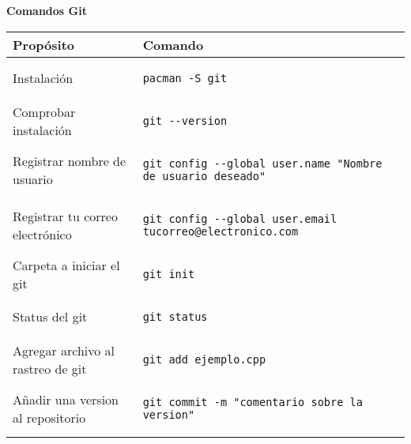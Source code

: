 \documentclass[landscape]{article}
\author{Nombre}
\begin{document}
	


\lstset{language=bash}  
\textbf{Comandos Git} \\

\begin{table}[ht]
\begin{center}
\begin{tabular}{| l | l |}

\hline
Propósito & Comando\\ \hline

Instalación & 
\begin{lstlisting}
pacman -S git
\end{lstlisting}\\ \hline

Comprobar instalación & 
\begin{lstlisting}
git --version
\end{lstlisting}\\ \hline


Registrar nombre de usuario  & 
\begin{lstlisting}
git config --global user.name "Nombre de usuario deseado" 
\end{lstlisting}\\ \hline

Registrar tu correo electrónico &
\begin{lstlisting}
git config --global user.email tucorreo@electronico.com
\end{lstlisting}\\ \hline

Carpeta a iniciar el git &
\begin{lstlisting}
git init
\end{lstlisting}\\ \hline

Status del git &
\begin{lstlisting}
git status
\end{lstlisting}\\ \hline

Agregar archivo al rastreo de git &
\begin{lstlisting}
git add ejemplo.cpp
\end{lstlisting}\\ \hline

Añadir una version al repositorio &
\begin{lstlisting}
git commit -m "comentario sobre la version"
\end{lstlisting}\\ \hline


\end{tabular}
\end{center}
\end{table}
\end{document}

